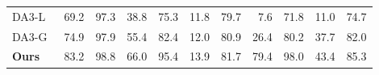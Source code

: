 \begin{table}[t]
{\begin{tabular}{l rr rr rr rr rr}
        DA3-L~\citep{lin2025depth}                              & 69.2 & 97.3 & 38.8 & 75.3 & 11.8 & 79.7 & 7.6 & 71.8 & 11.0 & 74.7 \\
        DA3-G~\citep{lin2025depth}                              & 74.9 & 97.9 & \cellcolor{tabyellow}55.4 & 82.4 & 12.0 & 80.9 & 26.4 & 80.2 & 37.7 & 82.0 \\
        \midrule
        \textbf{Ours}                                           & \cellcolor{taborange}83.2 & \cellcolor{taborange}98.8 & \cellcolor{tabred}66.0 & \cellcolor{tabred}95.4 & \cellcolor{tabyellow}13.9 & \cellcolor{taborange}81.7 & \cellcolor{tabred}79.4 & \cellcolor{tabred}98.0 & \cellcolor{tabred}43.4 & \cellcolor{taborange}85.3 \\
        \bottomrule
    \end{tabular}}
\end{table}








